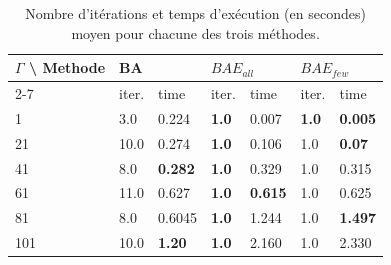 \documentclass[12pt, a4paper, twoside]{report}
\numberwithin{equation}{section}
\begin{document}
\begin{Figure}[H]
	\begin{table}[H]
		\label{tb:res_initiaux}
		\centering
		\begin{tabular}{@{}|l|llllll@{}}
			\toprule
			\multirow{2}{*}{$\Gamma$ \textbackslash{} Methode} & \multicolumn{2}{l|}{BA}                                & \multicolumn{2}{l|}{$BAE_{all}$}                              & \multicolumn{2}{l|}{$BAE_{few}$}                              \\ \cmidrule(l){2-7} 
			& iter.                     & time                       & iter.                     & time                       & iter.                     & time                       \\ \midrule
			1                                             & \multicolumn{1}{l|}{3.0} & \multicolumn{1}{l|}{0.224}  & \multicolumn{1}{l|}{\textbf{1.0}} & \multicolumn{1}{l|}{0.007}  & \multicolumn{1}{l|}{\textbf{1.0}} & \multicolumn{1}{l|}{\textbf{0.005}}  \\ \midrule
			21                                            & \multicolumn{1}{l|}{10.0} & \multicolumn{1}{l|}{0.274} & \multicolumn{1}{l|}{\textbf{1.0}} & \multicolumn{1}{l|}{0.106}  & \multicolumn{1}{l|}{1.0} & \multicolumn{1}{l|}{\textbf{0.07}}  \\ \midrule
			41                                            & \multicolumn{1}{l|}{8.0} & \multicolumn{1}{l|}{\textbf{0.282}} & \multicolumn{1}{l|}{\textbf{1.0}} & \multicolumn{1}{l|}{0.329} & \multicolumn{1}{l|}{1.0} & \multicolumn{1}{l|}{0.315}  \\ \midrule
			61                                            & \multicolumn{1}{l|}{11.0} & \multicolumn{1}{l|}{0.627} & \multicolumn{1}{l|}{\textbf{1.0}} & \multicolumn{1}{l|}{\textbf{0.615}}  & \multicolumn{1}{l|}{1.0} & \multicolumn{1}{l|}{0.625} \\ \midrule
			81                                            & \multicolumn{1}{l|}{8.0} & \multicolumn{1}{l|}{0.6045} & \multicolumn{1}{l|}{\textbf{1.0}} & \multicolumn{1}{l|}{1.244}  & \multicolumn{1}{l|}{1.0} & \multicolumn{1}{l|}{\textbf{1.497}} \\ \midrule
			101                                           & \multicolumn{1}{l|}{10.0} & \multicolumn{1}{l|}{\textbf{1.20}} & \multicolumn{1}{l|}{\textbf{1.0}}  & \multicolumn{1}{l|}{2.160}   & \multicolumn{1}{l|}{1.0} & \multicolumn{1}{l|}{2.330}  \\ \bottomrule
		\end{tabular}
		\caption{Nombre d'itérations et temps d'exécution (en secondes) moyen pour chacune des trois méthodes. \cite{portoleauROADEF}}
	\end{table}
		

\end{Figure}
\end{document}
